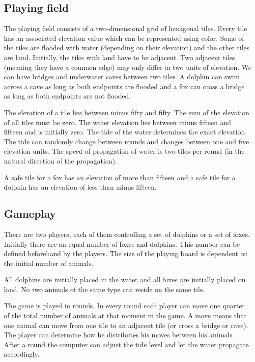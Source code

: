 \documentclass[12pt]{article}
\begin{document}
\subsection{Playing field}

The playing field consists of a two-dimensional grid of hexagonal tiles. Every tile has an associated elevation value which can be represented using color. Some of the tiles are flooded with water (depending on their elevation) and the other tiles are land. Initially, the tiles with land have to be adjacent. Two adjacent tiles (meaning they have a common edge) may only differ in two units of elevation. We can have bridges and underwater caves between two tiles. A dolphin can swim across a cave as long as both endpoints are flooded and a fox can cross a bridge as long as both endpoints are not flooded.

The elevation of a tile lies between minus fifty and fifty. The sum of the elevation of all tiles must be zero. The water elevation lies between minus fifteen and fifteen and is initially zero. The tide of the water determines the exact elevation. The tide can randomly change between rounds and changes between one and five elevation units. The speed of propagation of water is two tiles per round (in the natural direction of the propagation).

A safe tile for a fox has an elevation of more than fifteen and a safe tile for a dolphin has an elevation of less than minus fifteen.

\subsection{Gameplay}
There are two players, each of them controlling a set of dolphins or a set of foxes. Initially there are an equal number of foxes and dolphins. This number can be defined beforehand by the players. The size of the playing board is dependent on the initial number of animals.

All dolphins are initially placed in the water and all foxes are initially placed on land. No two animals of the same type can reside on the same tile.

The game is played in rounds. In every round each player can move one quarter of the total number of animals at that moment in the game. A move means that one animal can move from one tile to an adjacent tile (or cross a bridge or cave). The player can determine how he distributes his moves between his animals. After a round the computer can adjust the tide level and let the water propagate accordingly.
\end{document}

